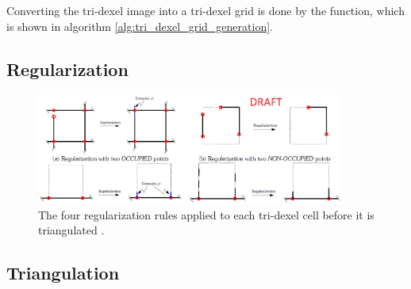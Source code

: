 Converting the tri-dexel image into a tri-dexel grid is done by the  function, which is shown in algorithm \ref{alg:tri_dexel_grid_generation}.
%
\begin{algorithm}
	\centering
	\begin{algorithmic}[1]
		
		\EndFunction
	\end{algorithmic}
	\caption{
		Creating a tri-dexel grid from the raycasted dexel images.
	}
	\label{alg:tri_dexel_grid_generation}
\end{algorithm}
%



\subsection{Regularization}
\label{sec:tri_dexel_regularization}

\begin{figure}
	\centering
	\includegraphics[width=0.9\textwidth]{images/tri_dexel_regularization}
	\caption{
		The four regularization rules applied to each tri-dexel cell before it is triangulated \cite{tridexel_reconstruction}.
	}
	\label{fig:tri_dexel_regularization}
\end{figure}


\begin{algorithm}
	\centering
	\begin{algorithmic}[1]
		
		\EndFunction
	\end{algorithmic}
	\caption{
		Regularizing a cell of the tri-dexel grid by applying the four rules specified in figure \ref{fig:tri_dexel_regularization} \cite{tridexel_reconstruction}.
	}
	\label{alg:tri_dexel_regularization}
\end{algorithm}


\subsection{Triangulation}
\label{sec:tri_dexel_triangulation}

